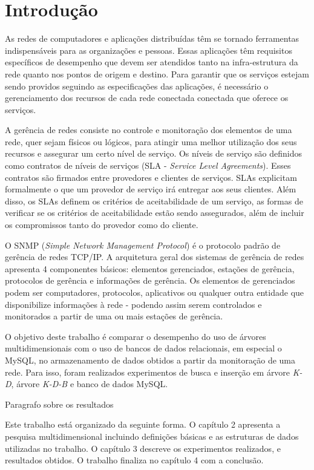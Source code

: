 \chapter{Introdução}

	As redes de computadores e aplicações distribuídas têm se tornado ferramentas indispensáveis para as organizações e pessoas. Essas aplicações têm requisitos específicos de desempenho que devem ser atendidos tanto na infra-estrutura da rede quanto nos pontos de origem e destino. Para garantir que os serviços estejam sendo providos seguindo as especificações das aplicações, é necessário o gerenciamento dos recursos de cada rede conectada conectada que oferece os serviços. 
	
	A gerência de redes \cite{NetworkManagement} consiste no controle e monitoração dos elementos de uma rede, quer sejam físicos ou lógicos, para atingir uma melhor utilização dos seus recursos e assegurar um certo nível de serviço. Os níveis de serviço são definidos como contratos de níveis de serviços (SLA - \textit{Service Level Agreements}). Esses contratos são firmados entre provedores e clientes de serviços. SLAs explicitam formalmente o que um provedor de serviço irá entregar aos seus clientes. Além disso, os SLAs definem os critérios de aceitabilidade de um serviço, as formas de verificar se os critérios de aceitabilidade estão sendo assegurados, além de incluir os compromissos tanto do provedor como do cliente.

	O SNMP (\textit{Simple Network Management Protocol}) é o protocolo padrão de gerência de redes TCP/IP. A arquitetura geral dos sistemas de gerência de redes apresenta 4 componentes básicos: elementos gerenciados, estações de gerência, protocolos de gerência e informações de gerência. Os elementos de gerenciados podem ser computadores, protocolos, aplicativos ou qualquer outra entidade que disponibilize informações à rede - podendo assim serem controlados e monitorados a partir de uma ou mais estações de gerência.



	O objetivo deste trabalho é comparar o desempenho do uso de árvores multidimensionais com o uso de bancos de dados relacionais, em especial o MySQL, no armazenamento de dados obtidos a partir da monitoração de uma rede. Para isso, foram realizados experimentos de busca e inserção em árvore \textit{K-D}, árvore \textit{K-D-B} e banco de dados MySQL.

	Paragrafo sobre os resultados

	Este trabalho está organizado da seguinte forma. O capítulo 2 apresenta a pesquisa multidimensional incluindo definições básicas e as estruturas de dados utilizadas no trabalho. O capítulo 3 descreve os experimentos realizados, e resultados obtidos. O trabalho finaliza no capítulo 4 com a conclusão.  
